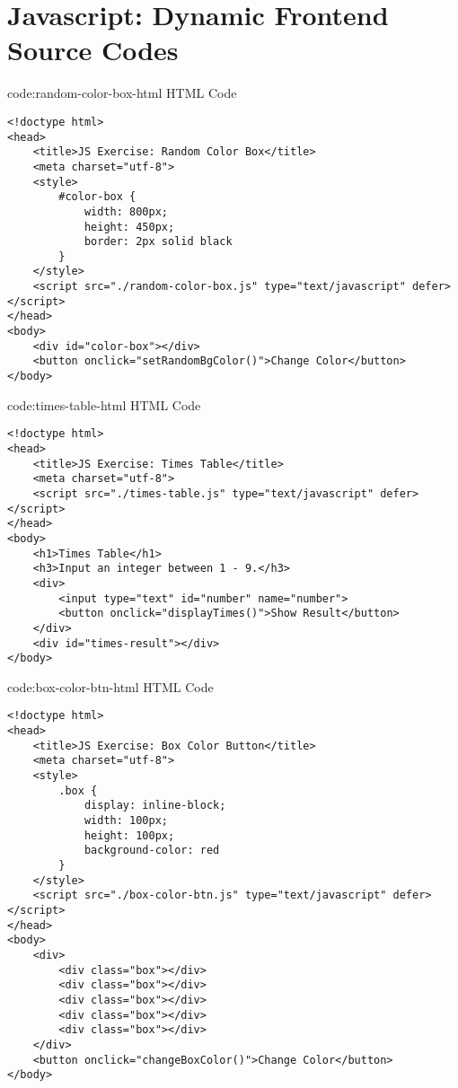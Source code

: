 \section{Javascript: Dynamic Frontend Source Codes}\label{sect:js-dynamic-frontend-codes}

\begin{codeenv}{code:random-color-box-html}{ HTML Code}
\begin{verbatim}
<!doctype html>
<head>
    <title>JS Exercise: Random Color Box</title>
    <meta charset="utf-8">
    <style>
        #color-box {
            width: 800px;
            height: 450px;
            border: 2px solid black
        }
    </style>
    <script src="./random-color-box.js" type="text/javascript" defer></script>
</head>
<body>
    <div id="color-box"></div>
    <button onclick="setRandomBgColor()">Change Color</button>
</body>
\end{verbatim}
\end{codeenv}

\begin{codeenv}{code:times-table-html}{ HTML Code}\begin{verbatim}
<!doctype html>
<head>
    <title>JS Exercise: Times Table</title>
    <meta charset="utf-8">
    <script src="./times-table.js" type="text/javascript" defer></script>
</head>
<body>
    <h1>Times Table</h1>
    <h3>Input an integer between 1 - 9.</h3>
    <div>
        <input type="text" id="number" name="number">
        <button onclick="displayTimes()">Show Result</button>
    </div>
    <div id="times-result"></div>
</body>
\end{verbatim}
\end{codeenv}

\begin{codeenv}{code:box-color-btn-html}{ HTML Code}
\begin{verbatim}
<!doctype html>
<head>
    <title>JS Exercise: Box Color Button</title>
    <meta charset="utf-8">
    <style>
        .box {
            display: inline-block;
            width: 100px;
            height: 100px;
            background-color: red
        }
    </style>
    <script src="./box-color-btn.js" type="text/javascript" defer></script>
</head>
<body>
    <div>
        <div class="box"></div>
        <div class="box"></div>
        <div class="box"></div>
        <div class="box"></div>
        <div class="box"></div>
    </div>
    <button onclick="changeBoxColor()">Change Color</button>
</body>
\end{verbatim}
\end{codeenv}

